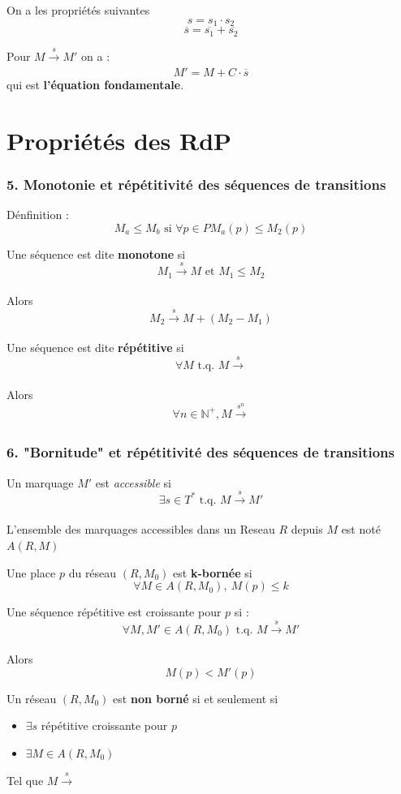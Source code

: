 \documentclass[12pt,a4paper,oneside]{article}
\begin{document}
		On a les propriétés suivantes
		$$s = s_1 \cdot s_2$$
		$$\overline{s} = \overline{s_1} + \overline{s_2}$$

		Pour $M \xrightarrow[]{s} M'$ on a :
		$$M' = M + C \cdot \overline{s}$$
	 	qui est \textbf{l'équation fondamentale}.

\section{Propriétés des RdP}
	\subsubsection*{5. Monotonie et répétitivité des séquences de transitions}

		Dénfinition :
		$$M_a \leq M_b \textrm{ si } \forall p \in P M_a(p) \leq M_2(p)$$

		Une séquence est dite \textbf{monotone} si
		$$M_1 \xrightarrow[]{s} M \textrm{ et } M_1 \leq M_2$$

		Alors
		$$M_2 \xrightarrow[]{s} M + (M_2 - M_1)$$

		Une séquence est dite \textbf{répétitive} si
		$$\forall M \textrm{ t.q. } M \xrightarrow[]{s}$$

		Alors
		$$\forall n \in \mathbb{N^+}, M \xrightarrow[]{s^n}$$

	\subsubsection*{6. "Bornitude" et répétitivité des séquences de transitions}

		Un marquage $M'$ est \textit{accessible} si
		$$\exists s \in T^* \textrm{ t.q. } M \xrightarrow[]{s} M'$$

		L'ensemble des marquages accessibles dans un Reseau $R$ depuis $M$ est noté $A(R,M)$

		Une place $p$ du réseau $(R, M_0)$ est \textbf{k-bornée} si
		$$\forall M \in A(R, M_0),\ M(p) \leq k$$

		Une séquence répétitive est croissante pour $p$ si :
		$$\forall M, M' \in A(R, M_0) \textrm{ t.q. } M \xrightarrow[]{s} M'$$

		Alors
		$$M(p) < M'(p)$$

		Un réseau $(R, M_0)$ est \textbf{non borné} si et seulement si
		\begin{itemize}
			\item $\exists s$ répétitive croissante pour $p$
			\item $\exists M \in A(R, M_0)$
		\end{itemize}
		Tel que $M \xrightarrow[]{s}$
\end{document}
